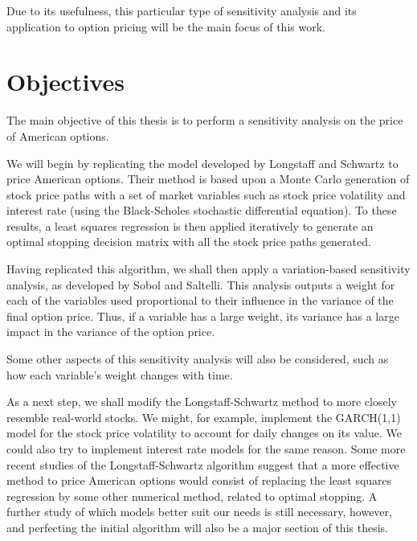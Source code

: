 \documentclass[a4paper,prd,twocolumn,nofootinbib,superscriptaddress,floatfix]{revtex4}
\begin{document}
Due to its usefulness, this particular type of sensitivity analysis and its application to option pricing will be the main focus of this work.

\section{Objectives}
The main objective of this thesis is to perform a sensitivity analysis on the price of American options.

We will begin by replicating the model developed by Longstaff and Schwartz to price American options. Their method is based upon a Monte Carlo generation of stock price paths with a set of market variables such as stock price volatility and interest rate (using the Black-Scholes stochastic differential equation). To these results, a least squares regression is then applied iteratively to generate an optimal stopping decision matrix with all the stock price paths generated.

Having replicated this algorithm, we shall then apply a variation-based sensitivity analysis, as developed by Sobol and Saltelli. This analysis outputs a weight for each of the variables used proportional to their influence in the variance of the final option price.
Thus, if a variable has a large weight, its variance has a large impact in the variance of the option price.

Some other aspects of this sensitivity analysis will also be considered, such as how each variable's weight changes with time.

As a next step, we shall modify the Longstaff-Schwartz method to more closely resemble real-world stocks.
We might, for example, implement the GARCH(1,1) model for the stock price volatility to account for daily changes on its value. We could also try to implement interest rate models for the same reason.
Some more recent studies of the Longstaff-Schwartz algorithm suggest that a more effective method to price American options would consist of replacing the least squares regression by some other numerical method, related to optimal stopping.
A further study of which models better suit our needs is still necessary, however, and perfecting the initial algorithm will also be a major section of this thesis.
\end{document}
